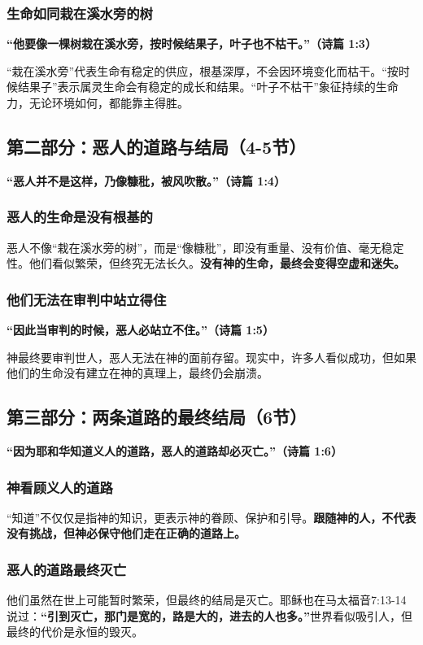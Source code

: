 \documentclass[a4paper, 12pt]{article}
\begin{document}
\subsubsection*{生命如同栽在溪水旁的树}
\textbf{“他要像一棵树栽在溪水旁，按时候结果子，叶子也不枯干。”（诗篇 1:3）}

“栽在溪水旁”代表生命有稳定的供应，根基深厚，不会因环境变化而枯干。“按时候结果子”表示属灵生命会有稳定的成长和结果。“叶子不枯干”象征持续的生命力，无论环境如何，都能靠主得胜。

\subsection*{第二部分：恶人的道路与结局（4-5节）}

\textbf{“恶人并不是这样，乃像糠秕，被风吹散。”（诗篇 1:4）}

\subsubsection*{恶人的生命是没有根基的}
恶人不像“栽在溪水旁的树”，而是“像糠秕”，即没有重量、没有价值、毫无稳定性。他们看似繁荣，但终究无法长久。\textbf{没有神的生命，最终会变得空虚和迷失。}

\subsubsection*{他们无法在审判中站立得住}
\textbf{“因此当审判的时候，恶人必站立不住。”（诗篇 1:5）}

神最终要审判世人，恶人无法在神的面前存留。现实中，许多人看似成功，但如果他们的生命没有建立在神的真理上，最终仍会崩溃。

\subsection*{第三部分：两条道路的最终结局（6节）}

\textbf{“因为耶和华知道义人的道路，恶人的道路却必灭亡。”（诗篇 1:6）}

\subsubsection*{神看顾义人的道路}
“知道”不仅仅是指神的知识，更表示神的眷顾、保护和引导。\textbf{跟随神的人，不代表没有挑战，但神必保守他们走在正确的道路上。}

\subsubsection*{恶人的道路最终灭亡}
他们虽然在世上可能暂时繁荣，但最终的结局是灭亡。耶稣也在马太福音7:13-14说过：\textbf{“引到灭亡，那门是宽的，路是大的，进去的人也多。”}世界看似吸引人，但最终的代价是永恒的毁灭。
\end{document}
